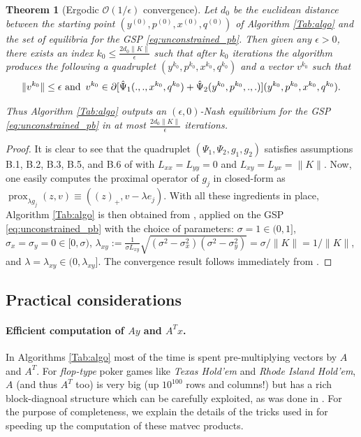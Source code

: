 \documentclass{article} %
\newtheorem{theorem}{Theorem} \newtheorem{lemma}[theorem]{Lemma}
\DeclareMathOperator{\prox}{prox}
\begin{document}
\begin{theorem}[Ergodic $\mathcal{O}(1/\epsilon)$ convergence]
Let $d_0$ be the euclidean distance between the starting point
$(y^{(0)},p^{(0)},x^{(0)},q^{(0)})$ of Algorithm \ref{Tab:algo} and the
set of equilibria for the GSP \eqref{eq:unconstrained_pb}.
Then given any $\epsilon > 0$, there exists an index
$k_0 \le \frac{2d_0\|K\|}{\epsilon}$ such that after $k_0$ iterations
the algorithm produces the following a quadruplet
$(y^{k_0},p^{k_0},x^{k_0},q^{k_0})$ and a vector $v^{k_0}$ such that
\begin{eqnarray}
\|v^{k_0}\| \le \epsilon \text{ and}\hspace{.5em} v^{k_0} \in
\partial[\hat{\Psi}_1(., ., x^{k_0}, q^{k_0}) +
  \hat{\Psi}_2(y^{k_0}, p^{k_0}, ., .)](y^{k_0},p^{k_0},x^{k_0},q^{k_0}).
\end{eqnarray}

Thus Algorithm \ref{Tab:algo} outputs an $(\epsilon,0)$-Nash
equilibrium for the GSP \eqref{eq:unconstrained_pb}
in at most $\frac{2d_0\|K\|}{\epsilon}$ iterations.
\end{theorem}

\begin{proof}
It is clear to see that the quadruplet $(\Psi_1, \Psi_2, g_1, g_2)$
satisfies assumptions B.1, B.2, B.3, B.5, and B.6 of
\cite{he2013accelerating} with $L_{xx} = L_{yy} = 0$ and $L_{xy} =
L_{yx} = \|K\|$. Now, one easily computes the proximal operator of
$g_j$ in closed-form as $\prox_{\lambda g_j}(z, v) \equiv ((z)_+,
v - \lambda e_j)$. With all these ingredients in place, Algorithm
\ref{Tab:algo} is then obtained from \cite[Algorithm
  T-BD]{he2013accelerating}, applied on the GSP
\eqref{eq:unconstrained_pb} with the choice of parameters: $\sigma = 1
\in (0, 1]$, $\sigma_x = \sigma_y = 0 \in [0, \sigma)$,
    $\lambda_{xy} := \frac{1}{\sigma L_{xy}}\sqrt{(\sigma^2 -
        \sigma_x^2)(\sigma^2 - \sigma_y^2)} = \sigma / \|K\| =
      1/\|K\|$, and $\lambda = \lambda_{xy} \in (0,
      \lambda_{xy}]$. The convergence result follows immediately from
  \cite[Theorem 4.2]{he2013accelerating}.
\end{proof}

\subsection{Practical considerations}
\paragraph{\textbf{Efficient computation of $Ay$ and $A^Tx$.}}
In Algorithms \ref{Tab:algo} most of the time is spent
pre-multiplying vectors by $A$ and $A^T$. For \textit{flop-type} poker
games like \textit{Texas Hold'em} and  \textit{Rhode Island Hold'em},
$A$ (and thus $A^T$ too)  is very big (up $10^{100}$ rows and columns!)
but has a rich block-diagnoal structure which can be carefully
exploited, as was done in \cite{hoda2010smoothing}. For the purpose of
completeness, we explain the details of the tricks used in
\cite{hoda2010smoothing} for speeding up the computation of these
matvec products.
\end{document}
